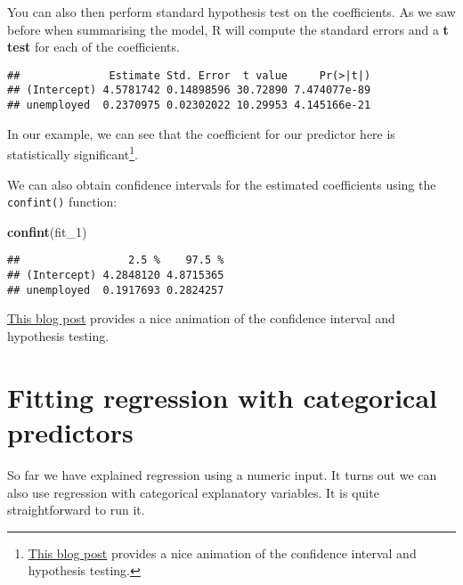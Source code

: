 \documentclass[
]{book}
\newenvironment{Shaded}{\begin{snugshade}}{\end{snugshade}}
\newcommand{\FunctionTok}[1]{\textcolor[rgb]{0.13,0.29,0.53}{\textbf{#1}}}
\newcommand{\NormalTok}[1]{#1}
\newcommand{\SpecialCharTok}[1]{\textcolor[rgb]{0.81,0.36,0.00}{\textbf{#1}}}
\begin{document}
You can also then perform standard hypothesis test on the coefficients. As we saw before when summarising the model, R will compute the standard errors and a \textbf{t test} for each of the coefficients.

\begin{Shaded}
\end{Shaded}

\begin{verbatim}
##              Estimate Std. Error  t value     Pr(>|t|)
## (Intercept) 4.5781742 0.14898596 30.72890 7.474077e-89
## unemployed  0.2370975 0.02302022 10.29953 4.145166e-21
\end{verbatim}

In our example, we can see that the coefficient for our predictor here is statistically significant\footnote{\href{http://www.sumsar.net/blog/2013/12/an-animation-of-the-construction-of-a-confidence-interval/}{This blog post} provides a nice animation of the confidence interval and hypothesis testing.}.

We can also obtain confidence intervals for the estimated coefficients using the \texttt{confint()} function:

\begin{Shaded}
\begin{Highlighting}[]
\FunctionTok{confint}\NormalTok{(fit\_1)}
\end{Highlighting}
\end{Shaded}

\begin{verbatim}
##                 2.5 %    97.5 %
## (Intercept) 4.2848120 4.8715365
## unemployed  0.1917693 0.2824257
\end{verbatim}

\href{http://www.sumsar.net/blog/2013/12/an-animation-of-the-construction-of-a-confidence-interval/}{This blog post} provides a nice animation of the confidence interval and hypothesis testing.

\section{Fitting regression with categorical predictors}\label{fitting-regression-with-categorical-predictors}

So far we have explained regression using a numeric input. It turns out we can also use regression with categorical explanatory variables. It is quite straightforward to run it.
\end{document}
